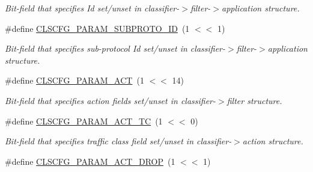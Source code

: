 \begin{DoxyCompactItemize}
\begin{DoxyCompactList}\small\item\em Bit-\/field that specifies Id set/unset in classifier-\/$>$filter-\/$>$application structure. \end{DoxyCompactList}\item 
\hypertarget{group__FAPI__QOS__CLASS_ga72340257f9a1ba50df18c1b3de859e32}{\#define \hyperlink{group__FAPI__QOS__CLASS_ga72340257f9a1ba50df18c1b3de859e32}{C\-L\-S\-C\-F\-G\-\_\-\-P\-A\-R\-A\-M\-\_\-\-S\-U\-B\-P\-R\-O\-T\-O\-\_\-\-I\-D}~(1 $<$$<$ 1)}\label{group__FAPI__QOS__CLASS_ga72340257f9a1ba50df18c1b3de859e32}

\begin{DoxyCompactList}\small\item\em Bit-\/field that specifies sub-\/protocol Id set/unset in classifier-\/$>$filter-\/$>$application structure. \end{DoxyCompactList}\item 
\hypertarget{group__FAPI__QOS__CLASS_gac6e642aff7a8cd5de9f5fd71655f89f5}{\#define \hyperlink{group__FAPI__QOS__CLASS_gac6e642aff7a8cd5de9f5fd71655f89f5}{C\-L\-S\-C\-F\-G\-\_\-\-P\-A\-R\-A\-M\-\_\-\-A\-C\-T}~(1 $<$$<$ 14)}\label{group__FAPI__QOS__CLASS_gac6e642aff7a8cd5de9f5fd71655f89f5}

\begin{DoxyCompactList}\small\item\em Bit-\/field that specifies action fields set/unset in classifier-\/$>$filter structure. \end{DoxyCompactList}\item 
\hypertarget{group__FAPI__QOS__CLASS_gaeb169b217ea7050e6231b2d4f5991fbf}{\#define \hyperlink{group__FAPI__QOS__CLASS_gaeb169b217ea7050e6231b2d4f5991fbf}{C\-L\-S\-C\-F\-G\-\_\-\-P\-A\-R\-A\-M\-\_\-\-A\-C\-T\-\_\-\-T\-C}~(1 $<$$<$ 0)}\label{group__FAPI__QOS__CLASS_gaeb169b217ea7050e6231b2d4f5991fbf}

\begin{DoxyCompactList}\small\item\em Bit-\/field that specifies traffic class field set/unset in classifier-\/$>$action structure. \end{DoxyCompactList}\item 
\hypertarget{group__FAPI__QOS__CLASS_ga4420d723c0be6b77b802c13ad30e7d8e}{\#define \hyperlink{group__FAPI__QOS__CLASS_ga4420d723c0be6b77b802c13ad30e7d8e}{C\-L\-S\-C\-F\-G\-\_\-\-P\-A\-R\-A\-M\-\_\-\-A\-C\-T\-\_\-\-D\-R\-O\-P}~(1 $<$$<$ 1)}\label{group__FAPI__QOS__CLASS_ga4420d723c0be6b77b802c13ad30e7d8e}


\end{DoxyCompactItemize}
